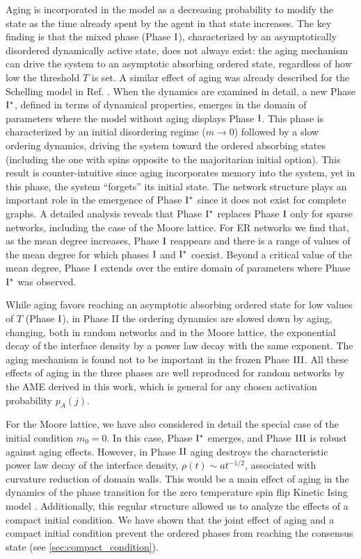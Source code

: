 	Aging is incorporated in the model as a decreasing probability to modify the state as the time already spent by the agent in that state increases. The key finding is that the mixed phase (Phase ${\rm I}$), characterized by an asymptotically disordered dynamically active state, does not always exist: the aging mechanism can drive the system to an asymptotic absorbing ordered state, regardless of how low the threshold $T$ is set. A similar effect of aging was already described for the Schelling model in Ref. \cite{Abella-2022}. When the dynamics are examined in detail, a new Phase ${\rm I}^{*}$, defined in terms of dynamical properties, emerges in the domain of parameters where the model without aging displays Phase ${\rm I}$. This phase is characterized by an initial disordering regime ($m \to 0$) followed by a slow ordering dynamics, driving the system toward the ordered absorbing states (including the one with spins opposite to the majoritarian initial option). This result is counter-intuitive since aging incorporates memory into the system, yet in this phase, the system ``forgets'' its initial state. The network structure plays an important role in the emergence of Phase ${\rm I}^{*}$ since it does not exist for complete graphs. A detailed analysis reveals that Phase ${\rm I}^{*}$ replaces Phase ${\rm I}$ only for sparse networks, including the case of the Moore lattice. For ER networks we find that, as the mean degree increases, Phase ${\rm I}$ reappears and there is a range of values of the mean degree for which phases ${\rm I}$ and ${\rm I}^{*}$ coexist. Beyond a critical value of the mean degree, Phase ${\rm I}$ extends over the entire domain of parameters where Phase ${\rm I}^{*}$ was observed.
	
	While aging favors reaching an asymptotic absorbing ordered state for low values of $T$ (Phase ${\rm I}$), in Phase II the ordering dynamics are slowed down by aging, changing, both in random networks and in the Moore lattice, the exponential decay of the interface density by a power law decay with the same exponent. The aging mechanism is found not to be important in the frozen Phase ${\rm III}$. All these effects of aging in the three phases are well reproduced for random networks by the AME derived in this work, which is general for any chosen activation probability $p_A (j)$.
	
	For the Moore lattice, we have also considered in detail the special case of the initial condition $m_0=0$. In this case, Phase ${\rm I}^{*}$ emerges, and Phase ${\rm III}$ is robust against aging effects. However, in Phase ${\rm II}$ aging destroys the characteristic power law decay of the interface density, $\rho(t) \sim at^{-1/2}$, associated with curvature reduction of domain walls. This would be a main effect of aging in the dynamics of the phase transition for the zero temperature spin flip Kinetic Ising model \cite{gunton1983}. Additionally, this regular structure allowed us to analyze the effects of a compact initial condition. We have shown that the joint effect of aging and a compact initial condition prevent the ordered phases from reaching the consensus state (see \ref{sec:compact_condition}).
	

